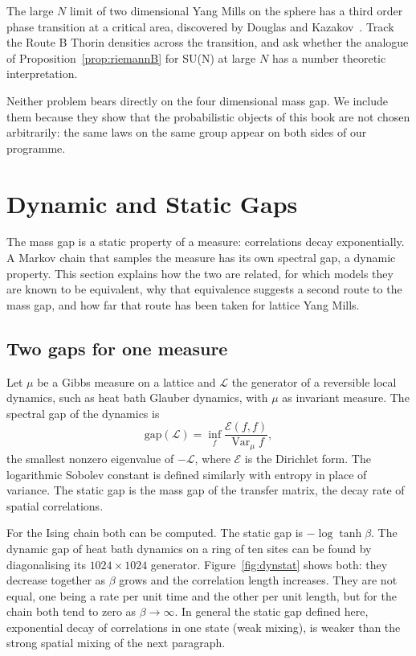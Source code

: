 \begin{problem}\label{op:exact2}
The large $N$ limit of two dimensional Yang Mills on the sphere has a third order phase transition at a critical area, discovered by Douglas and Kazakov~\cite{DK}. Track the Route B Thorin densities across the transition, and ask whether the analogue of Proposition~\ref{prop:riemannB} for SU(N) at large $N$ has a number theoretic interpretation.
\end{problem}

Neither problem bears directly on the four dimensional mass gap. We include them because they show that the probabilistic objects of this book are not chosen arbitrarily: the same laws on the same group appear on both sides of our programme.

\section{Dynamic and Static Gaps}\label{ch:dynamic}

The mass gap is a static property of a measure: correlations decay exponentially. A Markov chain that samples the measure has its own spectral gap, a dynamic property. This section explains how the two are related, for which models they are known to be equivalent, why that equivalence suggests a second route to the mass gap, and how far that route has been taken for lattice Yang Mills.

\subsection{Two gaps for one measure}

Let $\mu$ be a Gibbs measure on a lattice and $\mathcal L$ the generator of a reversible local dynamics, such as heat bath Glauber dynamics, with $\mu$ as invariant measure. The spectral gap of the dynamics is
\[
\mathrm{gap}(\mathcal L)=\inf_f\frac{\mathcal E(f,f)}{\operatorname{Var}_\mu f},
\]
the smallest nonzero eigenvalue of $-\mathcal L$, where $\mathcal E$ is the Dirichlet form. The logarithmic Sobolev constant is defined similarly with entropy in place of variance. The static gap is the mass gap of the transfer matrix, the decay rate of spatial correlations.

For the Ising chain both can be computed. The static gap is $-\log\tanh\beta$. The dynamic gap of heat bath dynamics on a ring of ten sites can be found by diagonalising its $1024\times1024$ generator. Figure~\ref{fig:dynstat} shows both: they decrease together as $\beta$ grows and the correlation length increases. They are not equal, one being a rate per unit time and the other per unit length, but for the chain both tend to zero as $\beta\to\infty$. In general the static gap defined here, exponential decay of correlations in one state (weak mixing), is weaker than the strong spatial mixing of the next paragraph.

